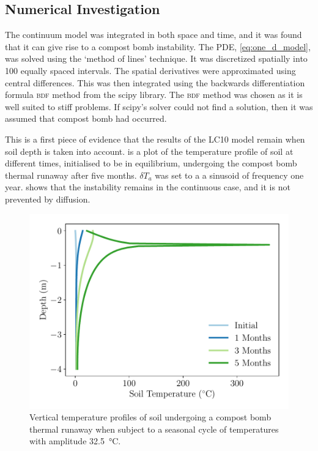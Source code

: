 \subsection{Numerical Investigation}
\label{sec:numerical_investigation}
The continuum model was integrated in both space and time, and it was found that it can give rise to a compost bomb instability.
The PDE, \cref{eq:one_d_model}, was solved using the `method of lines' technique\cite{Schiesser2012}. It was discretized spatially into 100 equally spaced intervals.
The spatial derivatives were approximated using central differences. This was then integrated using
the backwards differentiation formula \textsc{bdf} method from the scipy library\cite{Virtanen2020}. The \textsc{bdf} method was chosen as it is well suited to stiff problems.
If scipy's solver could not find a solution, then it was assumed that compost bomb had occurred.

This is a first piece of evidence that the results of the LC10 model remain when soil depth is taken into account. 
is a plot of the temperature profile of soil at different times, initialised to be in equilibrium, undergoing the compost bomb thermal runaway after five months.
$\delta T_a$ was set to a  a sinusoid of frequency one year.  shows that
the instability remains in the continuous case, and it is not prevented by diffusion.

\begin{figure}
  \centering
  \includegraphics[scale=0.5,keepaspectratio]{seasonal_cycle_profiles}
  \caption[Vertical profile of soil temperature]{Vertical temperature profiles of soil undergoing a compost bomb thermal runaway when subject to a seasonal cycle of temperatures with amplitude \SI{32.5}{\degreeCelsius}.}
  \label{fig:vertical_profiles}
\end{figure}
